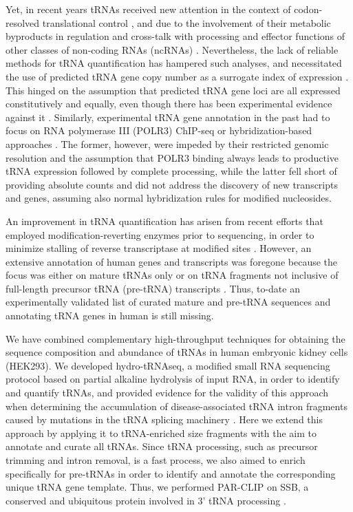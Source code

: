 \documentclass[12pt]{rockefeller}
\begin{document}
Yet, in recent years tRNAs received new attention in the context of codon-resolved translational control \cite{Dana:2012kq,Dana:2014bs,Mahlab:2012dg,Plotkin:2010fu,Tuller:2010ge,Weinberg:2016kh}, and due to the involvement of their metabolic byproducts in regulation and cross-talk with processing and effector functions of other classes of non-coding RNAs (ncRNAs) \cite{Hasler:2016ce,Ivanov:2011iu,Lee:2009fb}. Nevertheless, the lack of reliable methods for tRNA quantification has hampered such analyses, and necessitated the use of predicted tRNA gene copy number as a surrogate index of expression \cite{Iben:2014dt,Pechmann:2012ey,Tuller:2010ge}. This hinged on the assumption that predicted tRNA gene loci are all expressed constitutively and equally, even though there has been experimental evidence against it \cite{Gingold:2014iz}. Similarly, experimental tRNA gene annotation in the past had to focus on RNA polymerase III (POLR3) ChIP-seq \cite{Kutter:2011ff} \cite{Moqtaderi:2010hc} \cite{Oler:2010fb} or hybridization-based approaches \cite{Dittmar:2004fb} \cite{Goodarzi:2016gd}. The former, however, were impeded by their restricted genomic resolution and the assumption that POLR3 binding always leads to productive tRNA expression followed by complete processing, while the latter fell short of providing absolute counts and did not address the discovery of new transcripts and genes, assuming also normal hybridization rules for modified nucleosides.

An improvement in tRNA quantification has arisen from recent efforts that employed modification-reverting enzymes prior to sequencing, in order to minimize stalling of reverse transcriptase at modified sites \cite{Cozen:2015ds} \cite{Zheng:2015dw}. However, an extensive annotation of human genes and transcripts was foregone because the focus was either on mature tRNAs only \cite{Zheng:2015dw} or on tRNA fragments not inclusive of full-length precursor tRNA (pre-tRNA) transcripts \cite{Cozen:2015ds}. Thus, to-date an experimentally validated list of curated mature and pre-tRNA sequences and annotating tRNA genes in human is still missing.

We have combined complementary high-throughput techniques for obtaining the sequence composition and abundance of tRNAs in human embryonic kidney cells (HEK293). We developed hydro-tRNAseq, a modified small RNA sequencing protocol based on partial alkaline hydrolysis of input RNA, in order to identify and quantify tRNAs, and provided evidence for the validity of this approach when determining the accumulation of disease-associated tRNA intron fragments caused by mutations in the tRNA splicing machinery \cite{Karaca:2014em}. Here we extend this approach by applying it to tRNA-enriched size fragments with the aim to annotate and curate all tRNAs. Since tRNA processing, such as precursor trimming and intron removal, is a fast process\cite{Foretek:2016ea}, we also aimed to enrich specifically for pre-tRNAs in order to identify and annotate the corresponding unique tRNA gene template. Thus, we performed PAR-CLIP on SSB, a conserved and ubiquitous protein involved in 3’ tRNA processing \cite{Bayfield:2009cx} \cite{Bayfield:2010cs} \cite{Stefano:1984wp}. 
\end{document}
